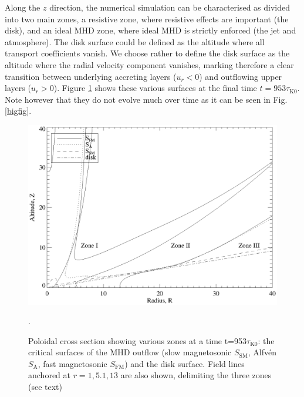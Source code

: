 \documentclass{aa}
\begin{document}
Along the $z$ direction, the numerical simulation can be characterised as divided into two main zones, a resistive zone, where resistive effects are important (the disk), and an ideal MHD zone, 
where ideal MHD is strictly enforced (the jet and atmosphere).  The disk surface could be defined as the altitude where all transport coefficients vanish. We choose rather to define the disk surface 
as the altitude where the radial velocity component vanishes, marking therefore a clear transition between underlying accreting layers ($u_r<0$) and outflowing upper layers ($u_r>0$). 
Figure \ref{surfaces} shows these various surfaces at the final time $t=953 \tau_\mathrm{K0}$. Note however that they do not evolve much over time as it can be seen in Fig. \ref{bigfig}.
   \begin{figure}
   \centering 
   \includegraphics[width=\columnwidth]{12633f02.eps}
   \caption{Poloidal cross section showing various zones at a time t=953$\tau_\mathrm{K0}$: the critical surfaces of the MHD outflow (slow magnetosonic $S_\mathrm{SM}$, Alfv\' en $S_\mathrm{A}$, fast magnetosonic $S_\mathrm{FM}$) and the disk
   surface. Field lines anchored at $r=1,5.1, 13$ are also shown, delimiting the three zones (see text)}.
              \label{surfaces}%
    \end{figure}
\end{document}
